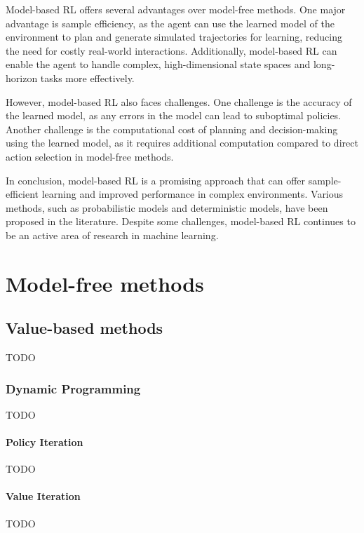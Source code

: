 \documentclass[../xlapes02]{subfiles}
\begin{document}
    Model-based RL offers several advantages over model-free methods.
    One major advantage is sample efficiency, as the agent can use the learned model of the environment to plan and generate simulated trajectories for learning, reducing the need for costly real-world interactions.
    Additionally, model-based RL can enable the agent to handle complex, high-dimensional state spaces and long-horizon tasks more effectively.

    However, model-based RL also faces challenges.
    One challenge is the accuracy of the learned model, as any errors in the model can lead to suboptimal policies.
    Another challenge is the computational cost of planning and decision-making using the learned model, as it requires additional computation compared to direct action selection in model-free methods.

    In conclusion, model-based RL is a promising approach that can offer sample-efficient learning and improved performance in complex environments.
    Various methods, such as probabilistic models and deterministic models, have been proposed in the literature.
    Despite some challenges, model-based RL continues to be an active area of research in machine learning.


    \section{Model-free methods}\label{sec:model-free-methods}

    \subsection{Value-based methods}\label{subsec:value-based-methods}
    TODO

    \subsubsection{Dynamic Programming}\label{subsubsec:dynamic-programming}
    TODO

    \paragraph{Policy Iteration}\label{par:policy-iteration}
    TODO

    \paragraph{Value Iteration}\label{par:value-iteration}
    TODO
\end{document}
